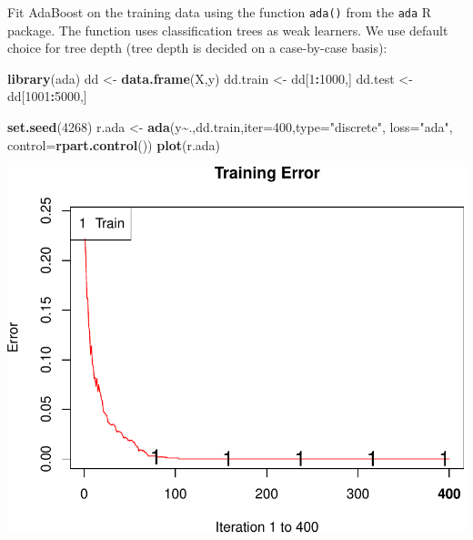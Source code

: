 \documentclass[
  10pt,
  ignorenonframetext,
]{beamer}
\newenvironment{Shaded}{\begin{snugshade}}{\end{snugshade}}
\newcommand{\AttributeTok}[1]{\textcolor[rgb]{0.13,0.29,0.53}{#1}}
\newcommand{\DecValTok}[1]{\textcolor[rgb]{0.00,0.00,0.81}{#1}}
\newcommand{\FunctionTok}[1]{\textcolor[rgb]{0.13,0.29,0.53}{\textbf{#1}}}
\newcommand{\NormalTok}[1]{#1}
\newcommand{\OtherTok}[1]{\textcolor[rgb]{0.56,0.35,0.01}{#1}}
\newcommand{\SpecialCharTok}[1]{\textcolor[rgb]{0.81,0.36,0.00}{\textbf{#1}}}
\newcommand{\StringTok}[1]{\textcolor[rgb]{0.31,0.60,0.02}{#1}}
\begin{document}
\begin{frame}[fragile]
Fit AdaBoost on the training data using the function \texttt{ada()} from
the \texttt{ada} R package. The function uses classification trees as
weak learners. We use default choice for tree depth (tree depth is
decided on a case-by-case basis):

\vspace{2mm}

\scriptsize
\centering

\begin{Shaded}
\begin{Highlighting}[]
\FunctionTok{library}\NormalTok{(ada)}
\NormalTok{dd }\OtherTok{\textless{}{-}} \FunctionTok{data.frame}\NormalTok{(X,y)}
\NormalTok{dd.train }\OtherTok{\textless{}{-}}\NormalTok{ dd[}\DecValTok{1}\SpecialCharTok{:}\DecValTok{1000}\NormalTok{,]}
\NormalTok{dd.test }\OtherTok{\textless{}{-}}\NormalTok{ dd[}\DecValTok{1001}\SpecialCharTok{:}\DecValTok{5000}\NormalTok{,]}

\FunctionTok{set.seed}\NormalTok{(}\DecValTok{4268}\NormalTok{)}
\NormalTok{r.ada }\OtherTok{\textless{}{-}} \FunctionTok{ada}\NormalTok{(y}\SpecialCharTok{\textasciitilde{}}\NormalTok{.,dd.train,}\AttributeTok{iter=}\DecValTok{400}\NormalTok{,}\AttributeTok{type=}\StringTok{"discrete"}\NormalTok{, }\AttributeTok{loss=}\StringTok{"ada"}\NormalTok{, }\AttributeTok{control=}\FunctionTok{rpart.control}\NormalTok{())}
\FunctionTok{plot}\NormalTok{(r.ada)}
\end{Highlighting}
\end{Shaded}

\includegraphics[width=0.5\linewidth]{9TreeBost_files/figure-beamer/unnamed-chunk-2-1}
\end{frame}
\end{document}
